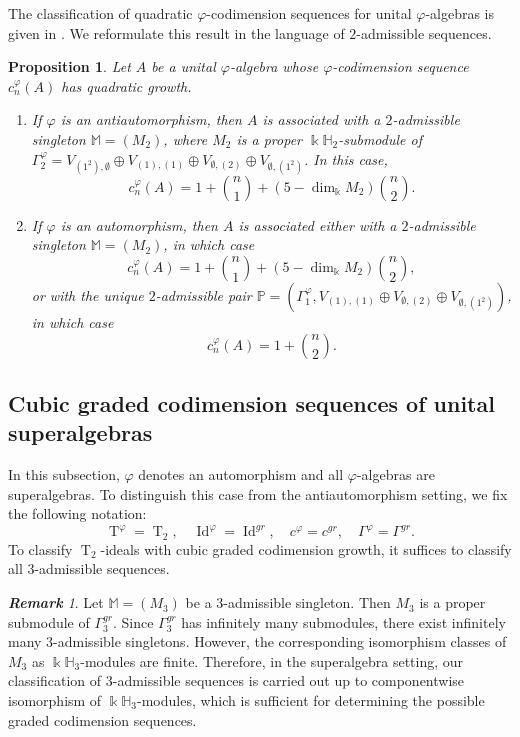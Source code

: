 \documentclass{amsart}
\newtheorem{prop}[thm]{Proposition}
\theoremstyle{definition}
\theoremstyle{remark}
\newtheorem{rmk}[thm]{\bf Remark}
\numberwithin{equation}{section}
\def \Ga{\Gamma}
\def \vp{\varphi}
\def \k{\Bbbk}
\def \H{\mathbb{H}}
\def \M{\mathbb{M}}
\def \P{\mathbb{P}}
\def \Id{\operatorname{Id}}
\def \T{\operatorname{T}}
\def \es{\emptyset}
\begin{document}
	The classification of quadratic $\vp$-codimension sequences for unital $\vp$-algebras is given in \cite[Theorem 5.1]{BSSV}. We reformulate this result in the language of $2$-admissible sequences.
	
\begin{prop}\cite[Theorem 5.1]{BSSV}\label{prop2.5}
	Let $A$ be a unital $\vp$-algebra whose $\vp$-codimension sequence $c_n^\vp(A)$ has quadratic growth.
		
	\begin{enumerate}
		\item[(1)] If $\vp$ is an antiautomorphism, then $A$ is associated with a $2$-admissible singleton $\M=(M_2)$, where $M_2$ is a proper $\k \H_2$-submodule of $\Ga_2^\vp = V_{(1^2), \es} \oplus  V_{(1),(1)} \oplus V_{\es,(2)} \oplus V_{\es,(1^2)}$. In this case,
		\[
		c_n^\vp(A)= 1+\binom{n}{1}+(5-\dim_\k M_2)\binom{n}{2}.
		\]
		\item[(2)] If $\vp$ is an automorphism, then $A$ is associated either with a $2$-admissible singleton $\M = (M_2)$, in which case
		\[
		c_n^\vp(A)= 1+\binom{n}{1}+(5-\dim_\k M_2)\binom{n}{2},
		\]
		or with the unique $2$-admissible pair $\P = (\Ga_1^\vp, V_{(1),(1)} \oplus V_{\es,(2)} \oplus V_{\es,(1^2)})$, in which case
		\[
		 c_n^\vp(A) = 1 + \binom{n}{2}.
		\]
	\end{enumerate}
\end{prop}
	
\subsection{Cubic graded codimension sequences of unital superalgebras}
	In this subsection, $\vp$ denotes an automorphism and all $\vp$-algebras are superalgebras. To distinguish this case from the antiautomorphism setting, we fix the following notation:
	\[
	\T^\vp = \T_2, \quad \Id^\vp = \Id^{gr}, \quad c^\vp = c^{gr}, \quad \Ga^\vp = \Ga^{gr}.
	\]	
	To classify $\T_2$-ideals with cubic graded codimension growth, it suffices to classify all $3$-admissible sequences.
	\begin{rmk}\label{rmk2.6}
		Let $\M=(M_3)$ be a $3$-admissible singleton. Then $M_3$ is a proper submodule of $\Ga_3^{gr}$. Since $\Ga_3^{gr}$ has infinitely many submodules, there exist infinitely many $3$-admissible singletons. However, the corresponding isomorphism classes of $M_3$ as $\k\H_3$-modules are finite. Therefore, in the superalgebra setting, our classification of $3$-admissible sequences is carried out up to componentwise isomorphism of $\k\H_3$-modules, which is sufficient for determining the possible graded codimension sequences.
	\end{rmk}
	
\end{document}
